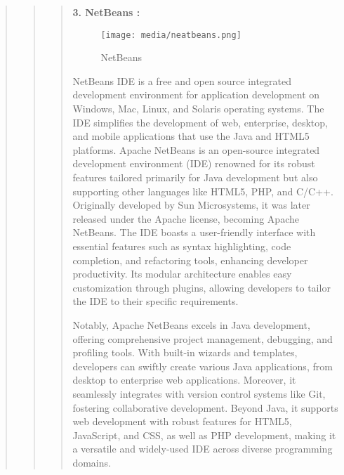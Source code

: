 \documentclass[12pt]{report}
\begin{document}
\begin{quote}
\begin{quote}
		
		\begin{quote}
			\textbf{3. NetBeans :}\\
			\begin{figure}
				\centering
				\texttt{[image: media/neatbeans.png]}\\
				\caption{NetBeans}
			\end{figure}
			NetBeans IDE is a free and open source integrated development environment for application development on Windows, Mac, Linux, and Solaris operating systems. The IDE simplifies the development of web, enterprise, desktop, and mobile applications that use the Java and HTML5 platforms.
			Apache NetBeans is an open-source integrated development environment (IDE) renowned for its robust features tailored primarily for Java development but also supporting other languages like HTML5, PHP, and C/C++. Originally developed by Sun Microsystems, it was later released under the Apache license, becoming Apache NetBeans. The IDE boasts a user-friendly interface with essential features such as syntax highlighting, code completion, and refactoring tools, enhancing developer productivity. Its modular architecture enables easy customization through plugins, allowing developers to tailor the IDE to their specific requirements.
			
			Notably, Apache NetBeans excels in Java development, offering comprehensive project management, debugging, and profiling tools. With built-in wizards and templates, developers can swiftly create various Java applications, from desktop to enterprise web applications. Moreover, it seamlessly integrates with version control systems like Git, fostering collaborative development. Beyond Java, it supports web development with robust features for HTML5, JavaScript, and CSS, as well as PHP development, making it a versatile and widely-used IDE across diverse programming domains.
			
		\end{quote}
		
		
	\end{quote}
	

	\end{quote}
	\clearpage
	
\end{document}
